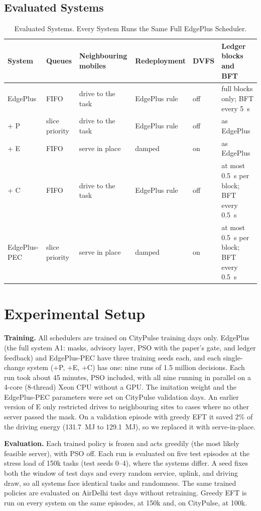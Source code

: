 \documentclass[11pt,journal,onecolumn]{IEEEtran}
\begin{document}
\subsection{Evaluated Systems}
\begin{table}[!t]
\centering
\caption{Evaluated Systems. Every System Runs the Same Full EdgePlus Scheduler.}
\label{tab:systems}
\footnotesize
\begin{tabular}{llllll}
\toprule
System & Queues & Neighbouring mobiles & Redeployment & DVFS & Ledger blocks and BFT\\
\midrule
EdgePlus & FIFO & drive to the task & EdgePlus rule & off & full blocks only; BFT every 5~s\\
+ P & slice priority & drive to the task & EdgePlus rule & off & as EdgePlus\\
+ E & FIFO & serve in place & damped & on & as EdgePlus\\
+ C & FIFO & drive to the task & EdgePlus rule & off & at most 0.5~s per block; BFT every 0.5~s\\
EdgePlus-PEC & slice priority & serve in place & damped & on & at most 0.5~s per block; BFT every 0.5~s\\
\bottomrule
\end{tabular}
\end{table}

\section{Experimental Setup}
\label{sec:setup}

\textbf{Training.} All schedulers are trained on CityPulse training days only. EdgePlus (the full system A1: masks, advisory layer, PSO with the paper's gate, and ledger feedback) and EdgePlus-PEC have three training seeds each, and each single-change system (+P, +E, +C) has one: nine runs of 1.5 million decisions. Each run took about 45 minutes, PSO included, with all nine running in parallel on a 4-core (8-thread) Xeon CPU without a GPU. The imitation weight and the EdgePlus-PEC parameters were set on CityPulse validation days. An earlier version of E only restricted drives to neighbouring sites to cases where no other server passed the mask. On a validation episode with greedy EFT it saved 2\% of the driving energy (131.7~MJ to 129.1~MJ), so we replaced it with serve-in-place.

\textbf{Evaluation.} Each trained policy is frozen and acts greedily (the most likely feasible server), with PSO off. Each run is evaluated on five test episodes at the stress load of 150k tasks (test seeds 0--4), where the systems differ. A seed fixes both the window of test days and every random service, uplink, and driving draw, so all systems face identical tasks and randomness. The same trained policies are evaluated on AirDelhi test days without retraining. Greedy EFT is run on every system on the same episodes, at 150k and, on CityPulse, at 100k.
\end{document}
